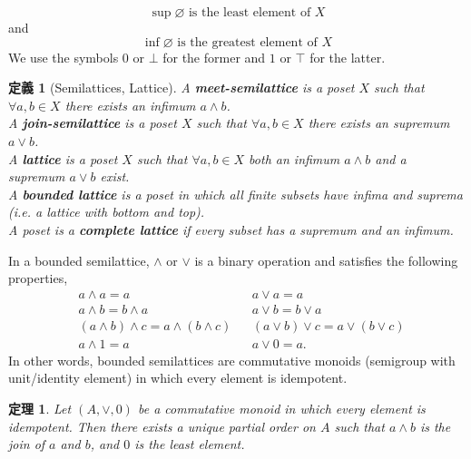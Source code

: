 \documentclass[a4j,12pt]{jarticle}
\numberwithin{equation}{section}
\newcommand{\itbf}[1]{\textit{\textbf{#1}}}
\newtheorem{dfn}{定義}[section]
\newtheorem{thm}{定理}[section]
\begin{document}
\begin{equation}
  \sup\varnothing \text{ is the least element of } X
\end{equation}
and
\begin{equation}
  \inf\varnothing \text{ is the greatest element of } X
\end{equation}
We use the symbols $0$ or $\bot$ for the former and $1$ or $\top$ for the latter.\\
\begin{dfn}[Semilattices, Lattice]
  A \itbf{meet-semilattice} is a poset $X$ such that $\forall a,b \in X$ there exists an infimum $a \wedge b$.\\
  A \itbf{join-semilattice} is a poset $X$ such that $\forall a,b \in X$ there exists an supremum $a \vee b$.\\
  A \itbf{lattice} is a poset $X$ such that $\forall a,b \in X$ both an infimum $a \wedge b$ and a supremum $a \vee b$ exist.\\
  A \itbf{bounded lattice} is a poset in which all finite subsets have infima and suprema (i.e. a lattice with bottom and top).\\
  A poset is a \itbf{complete lattice} if every subset has a supremum and an infimum.
\end{dfn}
In a bounded semilattice, $\wedge$ or $\vee$ is a binary operation and satisfies the following properties,
\begin{align}
  & a \wedge a = a && a \vee a = a\\
  & a \wedge b = b \wedge a &&  a \vee b = b \vee a \\
  & (a \wedge b) \wedge c = a \wedge (b \wedge c)  && (a \vee b) \vee c = a \vee (b \vee c) \\
  & a \wedge 1 = a && a \vee 0 = a.
\end{align}
In other words, bounded semilattices are commutative monoids (semigroup with unit/identity element) in which every element is idempotent.\\
\begin{thm} \label{thm:comm-monoid-is-lattice}
  Let $(A, \vee, 0)$ be a commutative monoid in which every element is idempotent.
  Then there exists a unique partial order on $A$ such that $a \wedge b$ is the join of $a$ and $b$, and $0$ is the least element.
\end{thm}
\end{document}
